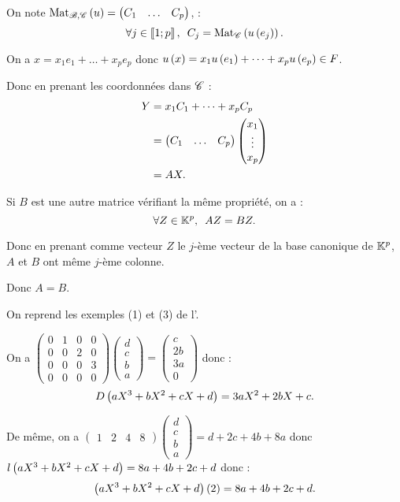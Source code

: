 \begin{dem}
On note \(\Mat[\fami{B},\fami{C}]{u}=\begin{pmatrix}C_1 & \dots & C_p\end{pmatrix}\), \cad : \[\quantifs{\forall j\in\interventierii{1}{p}}C_j=\Mat[\fami{C}]{u\paren{e_j}}.\]

On a \(x=x_1e_1+\dots+x_pe_p\) donc \(u\left(x\right)=x_1u\left(e_1\right)+\dots+x_pu\left(e_p\right)\in F\).

Donc en prenant les coordonnées dans \(\mathscr{C}\) : \[\begin{aligned}
Y&=x_1C_1+\dots+x_pC_p \\
&=\begin{pmatrix}C_1 & \dots & C_p\end{pmatrix}\begin{pmatrix}x_1\\\vdots\\x_p\end{pmatrix} \\
&=AX.
\end{aligned}\]

Si \(B\) est une autre matrice vérifiant la même propriété, on a : \[\quantifs{\forall Z\in\K^p}AZ=BZ.\]

Donc en prenant comme vecteur \(Z\) le \(j\)-ème vecteur de la base canonique de \(\mathbb{K}^p\), \(A\) et \(B\) ont même \(j\)-ème colonne.

Donc \(A=B\).
\end{dem}

\begin{ex}
On reprend les exemples (1) et (3) de l'.

On a \(\begin{pmatrix}
0 & 1 & 0 & 0 \\
0 & 0 & 2 & 0 \\
0 & 0 & 0 & 3 \\
0 & 0 & 0 & 0
\end{pmatrix}\begin{pmatrix}d \\ c \\ b \\ a\end{pmatrix}=\begin{pmatrix}c \\ 2b \\ 3a \\ 0\end{pmatrix}\) donc : \[D\left(aX^3+bX^2+cX+d\right)=3aX^2+2bX+c.\]

De même, on a \(\begin{pmatrix}1 & 2 & 4 & 8\end{pmatrix}\begin{pmatrix}d \\ c \\ b \\ a\end{pmatrix}=d+2c+4b+8a\) donc \(l\left(aX^3+bX^2+cX+d\right)=8a+4b+2c+d\) donc : \[\left(aX^3+bX^2+cX+d\right)\left(2\right)=8a+4b+2c+d.\]
\end{ex}